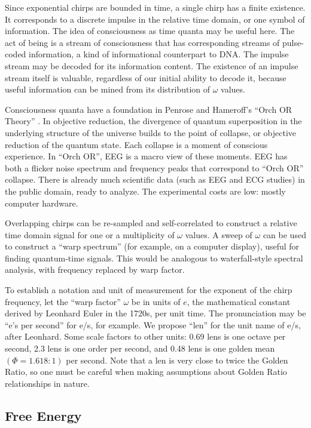 Since exponential chirps are bounded in time, a single chirp has a finite
existence. It corresponds to a discrete impulse in the relative time domain,
or one symbol of information.
The idea of consciousness as time quanta may be useful here.
The act of being is a stream of consciousness that has corresponding streams
of pulse-coded information, a kind of informational counterpart to DNA.
The impulse stream may be decoded for its information content.
The existence of an impulse stream itself is valuable,
regardless of our initial ability to decode it, because useful information
can be mined from its distribution of $\omega$ values.

Consciousness quanta have a foundation in Penrose and Hameroff's
``Orch OR Theory'' \cite{Hameroff}.
In objective reduction, the divergence of quantum superposition in the
underlying structure of the universe builds to the point of collapse,
or objective reduction of the quantum state.
Each collapse is a moment of conscious experience.
In ``Orch OR'', EEG is a macro view of these moments.
EEG has both a flicker noise spectrum and frequency peaks that correspond
to ``Orch OR'' collapse.
There is already much scientific data (such as EEG and ECG studies) in the
public domain, ready to analyze.
The experimental costs are low: mostly computer hardware.

Overlapping chirps can be re-sampled and self-correlated to construct a relative
time domain signal for one or a multiplicity of $\omega$ values.
A sweep of $\omega$ can be used to construct a ``warp spectrum'' (for example,
on a computer display), useful for finding quantum-time signals.
This would be analogous to waterfall-style spectral analysis, with frequency
replaced by warp factor.

To establish a notation and unit of measurement for the exponent of the chirp
frequency, let the ``warp factor'' $\omega$ be in units of $e$, the
mathematical constant derived by Leonhard Euler in the 1720s, per unit time.
The pronunciation may be ``e's per second'' for e/s, for example.
We propose ``len'' for the unit name of e/s, after Leonhard.
Some scale factors to other units: 0.69 lens is one octave per second,
2.3 lens is one order per second, and 0.48 lens is one golden mean
$(\Phi=1.618:1)$ per second.
Note that a len is very close to twice the Golden Ratio,
so one must be careful when making assumptions about Golden Ratio relationships
in nature.

\subsection{Free Energy}

